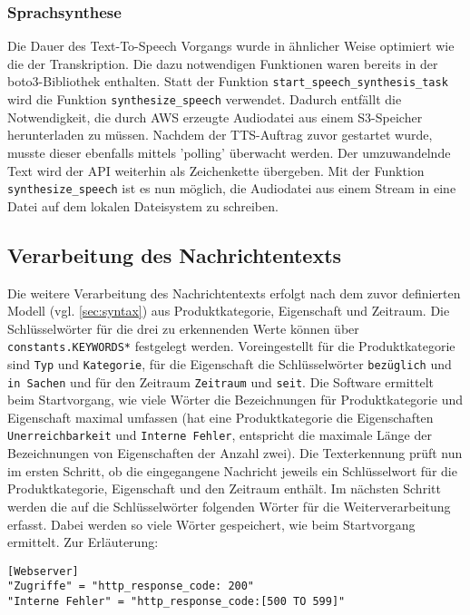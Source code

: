 \subsubsection{Sprachsynthese}

Die Dauer des Text-To-Speech Vorgangs wurde in ähnlicher Weise optimiert wie die der Transkription. Die dazu notwendigen Funktionen waren bereits in der boto3-Bibliothek enthalten. Statt der Funktion \lstinline{start_speech_synthesis_task} wird die Funktion \lstinline{synthesize_speech} verwendet. Dadurch entfällt die Notwendigkeit, die durch AWS erzeugte Audiodatei aus einem S3-Speicher herunterladen zu müssen. Nachdem der TTS-Auftrag zuvor gestartet wurde, musste dieser ebenfalls mittels 'polling' überwacht werden. Der umzuwandelnde Text wird der API weiterhin als Zeichenkette übergeben. Mit der Funktion \lstinline{synthesize_speech} ist es nun möglich, die Audiodatei aus einem Stream in eine Datei auf dem lokalen Dateisystem zu schreiben. 

\subsection{Verarbeitung des Nachrichtentexts}

Die weitere Verarbeitung des Nachrichtentexts erfolgt nach dem zuvor definierten Modell (vgl. \autoref{sec:syntax}) aus Produktkategorie, Eigenschaft und Zeitraum. Die Schlüsselwörter für die drei zu erkennenden Werte können über \lstinline{constants.KEYWORDS*} festgelegt werden. Voreingestellt für die Produktkategorie sind \lstinline{Typ} und \lstinline{Kategorie}, für die Eigenschaft die Schlüsselwörter \lstinline{bezüglich} und \lstinline{in Sachen} und für den Zeitraum \lstinline{Zeitraum} und \lstinline{seit}. Die Software ermittelt beim Startvorgang, wie viele Wörter die Bezeichnungen für Produktkategorie und Eigenschaft maximal umfassen (hat eine Produktkategorie die Eigenschaften \lstinline{Unerreichbarkeit} und \lstinline{Interne Fehler}, entspricht die maximale Länge der Bezeichnungen von Eigenschaften der Anzahl zwei). Die Texterkennung prüft nun im ersten Schritt, ob die eingegangene Nachricht jeweils ein Schlüsselwort für die Produktkategorie, Eigenschaft und den Zeitraum enthält. Im nächsten Schritt werden die auf die Schlüsselwörter folgenden Wörter für die Weiterverarbeitung erfasst. Dabei werden so viele Wörter gespeichert, wie beim Startvorgang ermittelt. Zur Erläuterung:

\begin{lstlisting}[caption={Auszug aus der Datei config.toml}, label=config-toml, xleftmargin=6mm]
[Webserver]
"Zugriffe" = "http_response_code: 200"
"Interne Fehler" = "http_response_code:[500 TO 599]"
\end{lstlisting}

